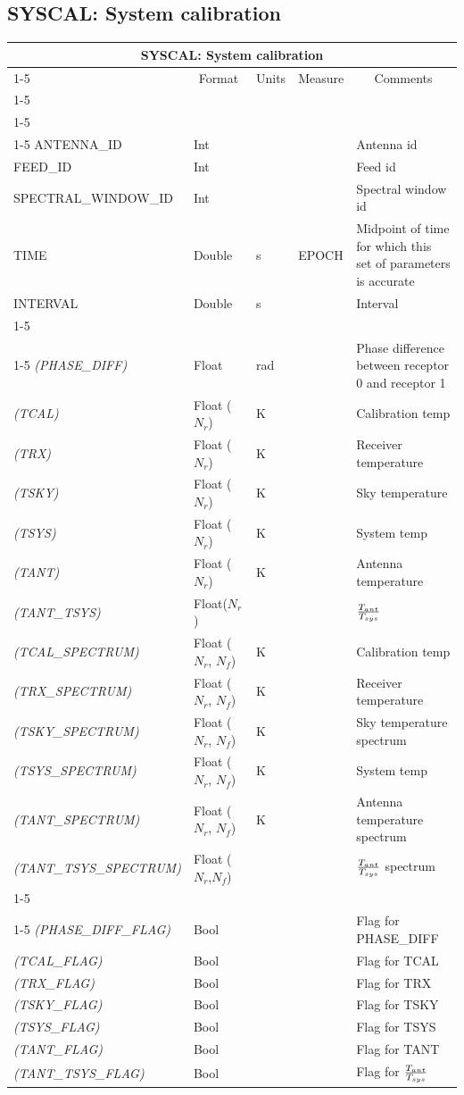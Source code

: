 \documentclass{article}
\newcommand{\nr}{$N_r$}
\newcommand{\nf}{$N_f$}
\newcommand{\defline}[1]{\cline{1-5}
\multicolumn{5}{|l|}{#1} \\
\cline{1-5}}
\newcommand{\definetable}[2]
{
	\vfill\newpage
	\subsection{#1}
        \vspace{0.15in}
        \small
	\begin{tabular}{|l|p{1.25in}|l|p{.9in}|p{1.4in}|}
	\hline
	\multicolumn{5}{|c|}{\bf #1}\\ 
	\cline{1-5}
        \multicolumn{1}{|c|}{Name}&\multicolumn{1}{|c|}{Format}&
        \multicolumn{1}{|c|}{Units}&\multicolumn{1}{|c|}{Measure}&
        \multicolumn{1}{|c|}{Comments}\\
        \cline{1-5}
        #2
        \hline
	\end{tabular}
}
\begin{document}
\definetable{SYSCAL: System calibration}{
\defline{\bf Columns}
\defline{\em Key}
ANTENNA\_ID &     Int &    &      & Antenna id\\
FEED\_ID &        Int &    &      & Feed id\\
SPECTRAL\_WINDOW\_ID &   Int &    &      & Spectral window id\\
TIME      &   Double  &      s  & EPOCH & Midpoint of time for which this set of parameters is accurate\\
INTERVAL &       Double  &      s     &   & Interval\\
\defline{\em Data}  
{\it (PHASE\_DIFF)} &  Float & rad &    & Phase difference between receptor 0 and receptor 1\\
{\it (TCAL)} &       Float (\nr)  &      K &  & Calibration temp\\
{\it (TRX)}  &       Float (\nr)  &      K &  & Receiver temperature\\
{\it (TSKY)} &       Float (\nr)  &      K &  & Sky temperature\\
{\it (TSYS)} &       Float (\nr)  &      K &  & System temp\\
{\it (TANT)} &       Float (\nr)  &      K &  & Antenna temperature\\
{\it (TANT\_TSYS)} & Float(\nr) &  & & ${{T_{ant}}\over{T_{sys}}}$\\
{\it (TCAL\_SPECTRUM)} &       Float (\nr, \nf)  &      K &  & Calibration temp\\
{\it (TRX\_SPECTRUM)}  &       Float (\nr, \nf)  &      K &  & Receiver temperature\\
{\it (TSKY\_SPECTRUM)}  &       Float (\nr, \nf)  &      K &  & Sky temperature spectrum\\
{\it (TSYS\_SPECTRUM)} &       Float (\nr, \nf)  &      K &  & System temp\\
{\it (TANT\_SPECTRUM)} &       Float (\nr, \nf)  &      K &  & Antenna temperature spectrum\\
{\it (TANT\_TSYS\_SPECTRUM)} & Float (\nr,\nf) &  & & ${{T_{ant}}\over{T_{sys}}}$ spectrum\\
\defline{\em Flags}
{\it (PHASE\_DIFF\_FLAG)} &   Bool  &    &      & Flag for PHASE\_DIFF\\
{\it (TCAL\_FLAG)} &  Bool &    &      & Flag for TCAL\\
{\it (TRX\_FLAG)} &   Bool  &    &      & Flag for TRX\\
{\it (TSKY\_FLAG)} & Bool &      &      & Flag for TSKY\\
{\it (TSYS\_FLAG)} &  Bool &    &      & Flag for TSYS\\
{\it (TANT\_FLAG)} & Bool & & & Flag for TANT\\
{\it (TANT\_TSYS\_FLAG)} & Bool & & & Flag for ${{T_{ant}}\over{T_{sys}}}$\\
}
\end{document}
